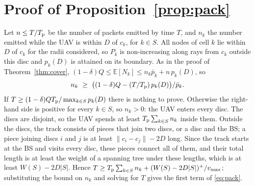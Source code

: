 \section{Proof of Proposition~\ref{prop:pack}}\label{app:pack}
Let $n\le T/T_{\mathrm p}$ be the number of packets emitted by time $T$, and $n_k$ the number emitted while the UAV is within $D$ of
$c_k$, for $k\in S$. All nodes of cell $k$ lie within $D$ of $c_k$ for the radii considered, so $P_k$ is non-increasing
along rays from $c_k$ outside this disc and $p_k(D)$ is attained on its boundary. As in the proof of
Theorem~\ref{thm:cover}, $(1-\delta)Q\le\mathbb{E}[N_k]\le n_k\bar p_k+n\,p_k(D)$, so
\[
n_k\ \ge\ \bigl((1-\delta)Q-(T/\Tp)\,p_k(D)\bigr)/\bar p_k .
\]
If $T\ge(1-\delta)QT_{\mathrm p}/\max_{k\in S}p_k(D)$ there is nothing to prove. Otherwise the right-hand side is positive for
every $k\in S$, so $n_k>0$: the UAV enters every disc.
The discs are disjoint, so the UAV spends at least $T_{\mathrm p}\sum_{k\in S}n_k$ inside them. Outside the discs, the track
consists of pieces that join two discs, or a disc and the BS; a piece joining discs $i$ and $j$ is at least
$\lVert c_i-c_j\rVert-2D$ long. Since the track starts at the BS and visits every disc, these pieces
connect all of them, and their total length is at least the weight of a spanning tree under these lengths, which is at
least $W(S)-2D|S|$. Hence $T\ge T_{\mathrm p}\sum_{k\in S}n_k+(W(S)-2D|S|)^+/v_{\max}$; substituting the bound on $n_k$ and
solving for $T$ gives the first term of \eqref{eq:pack}. \hfill\IEEEQED

